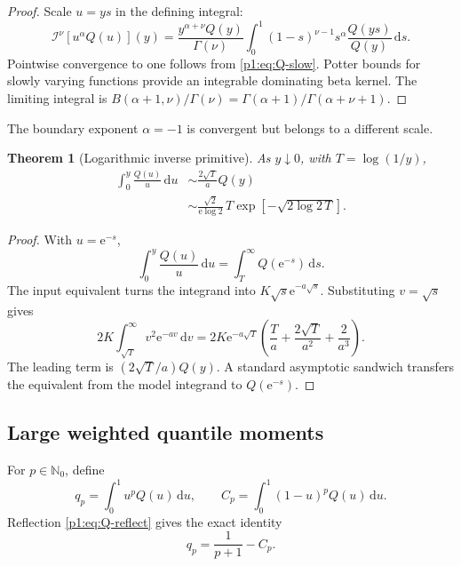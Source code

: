 \documentclass[11pt,oneside]{article}
\newtheorem{theorem}{Theorem}[section]
\theoremstyle{definition}
\theoremstyle{remark}
\newcommand{\N}{\mathbb N}
\newcommand{\dd}{\,\mathrm d}
\newcommand{\e}{\mathrm e}
\newcommand{\RL}{\mathcal I}
\newcommand{\1}{\mathbf 1}
\begin{document}
\begin{proof}
Scale \(u=ys\) in the defining integral:
\[
 \RL^\nu[u^\alpha Q(u)](y)
 =\frac{y^{\alpha+\nu}Q(y)}{\Gamma(\nu)}
 \int_0^1(1-s)^{\nu-1}s^\alpha\frac{Q(ys)}{Q(y)}\dd s.
\]
Pointwise convergence to one follows from \eqref{p1:eq:Q-slow}.  Potter bounds
for slowly varying functions provide an integrable dominating beta kernel.
The limiting integral is
\(B(\alpha+1,\nu)/\Gamma(\nu)
=\Gamma(\alpha+1)/\Gamma(\alpha+\nu+1)\).
\end{proof}

The boundary exponent \(\alpha=-1\) is convergent but belongs to a different
scale.

\begin{theorem}[Logarithmic inverse primitive]\label{p1:thm:Q-log-asympt}
As \(y\downarrow0\), with \(T=\log(1/y)\),
\begin{align}
 \int_0^y\frac{Q(u)}u\dd u
 &\sim\frac{2\sqrt T}{a}Q(y)                                  \label{p1:eq:Q-log-relative}\\
 &\sim\frac{\sqrt2}{\e\log2}\,T
 \exp\!\left[-\sqrt{2\log2\,T}\right].                     \label{p1:eq:Q-log-explicit}
\end{align}
\end{theorem}

\begin{proof}
With \(u=\e^{-s}\),
\[
 \int_0^y\frac{Q(u)}u\dd u=\int_T^\infty Q(\e^{-s})\dd s.
\]
The input equivalent turns the integrand into
\(K\sqrt s\e^{-a\sqrt s}\).  Substituting \(v=\sqrt s\) gives
\[
 2K\int_{\sqrt T}^{\infty}v^2\e^{-av}\dd v
 =2K\e^{-a\sqrt T}
 \left(\frac{T}{a}+\frac{2\sqrt T}{a^2}+\frac2{a^3}\right).
\]
The leading term is \((2\sqrt T/a)Q(y)\).  A standard asymptotic sandwich
transfers the equivalent from the model integrand to \(Q(\e^{-s})\).
\end{proof}

\subsection{Large weighted quantile moments}
For \(p\in\N_0\), define
\begin{equation}
 q_p=\int_0^1u^pQ(u)\dd u,
 \qquad
 C_p=\int_0^1(1-u)^pQ(u)\dd u.                                 \label{p1:eq:qCp}
\end{equation}
Reflection \eqref{p1:eq:Q-reflect} gives the exact identity
\begin{equation}
 q_p=\frac1{p+1}-C_p.                                          \label{p1:eq:q-reflection}
\end{equation}
\end{document}
